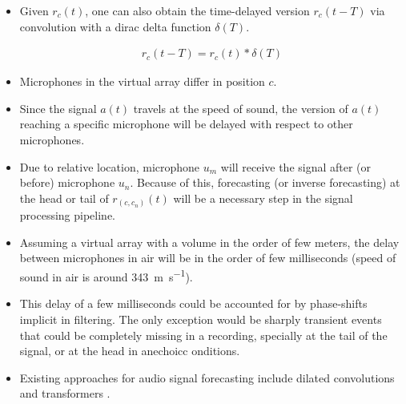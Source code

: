 \documentclass[14pt]{extarticle}
\begin{document}
\begin{itemize}

\item Given $r_c(t)$, one can also obtain the time-delayed version $r_c(t-T)$ via convolution with a dirac delta function $\delta(T)$. 

\begin{align*}
r_c(t-T) = r_c(t) \ast \delta(T)
\end{align*}

\item Microphones in the virtual array differ in position $c$. 

\item Since the signal $a(t)$ travels at the speed of sound, the version of $a(t)$ reaching a specific microphone will be delayed with respect to other microphones.

\item Due to relative location, microphone $u_m$ will receive the signal after (or before) microphone $u_n$. Because of this, forecasting (or inverse forecasting) at the head or tail of $r_{(c,c_n)}(t)$ will be a necessary step in the signal processing pipeline. 

\item Assuming a virtual array with a volume in the order of few meters, the delay between microphones in air will be in the order of few milliseconds (speed of sound in air is around \SI{343}{\metre\per\second}).

\item This delay of a few milliseconds could be accounted for by phase-shifts implicit in filtering. The only exception would be sharply transient events that could be completely missing in a recording, specially at the tail of the signal, or at the head in anechoicc onditions.

\item Existing approaches for audio signal forecasting include dilated convolutions \cite{oord2016wavenet} and transformers \cite{child2019generating}. 

\end{itemize}



\end{document}
